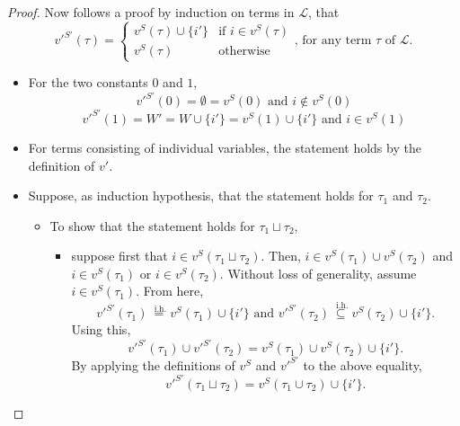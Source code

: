 \documentclass{article}
\newcommand{\lang}{\mathcal{L}}
\newcommand{\lcup}{\sqcup}
\newcommand{\eqih}{\stackrel{\text{ i.h.}}{=}}
\begin{document}
\begin{proof}
Now follows a proof by induction on terms in $\lang$, that
\begin{equation*}
  v'^{S'}(\tau) =
  \begin{cases}
    v^S(\tau) \cup \{i'\} & \text{if } i \in v^S(\tau) \\
    v^S(\tau)             & \text{otherwise}
  \end{cases}
  \text{, for any term } \tau \text{ of } \lang.
\end{equation*}
\begin{itemize}
  \item For the two constants $0$ and $1$,
    \begin{equation*}
      v'^{S'}(0) = \emptyset = v^S(0) \text{ and } i \not \in v^S(0)
    \end{equation*}
    \begin{equation*}
      v'^{S'}(1) = W' = W \cup \{i'\} = v^S(1) \cup \{i'\} \text{ and } i \in v^S(1)
    \end{equation*}
  \item For terms consisting of individual variables, the statement holds by the definition of $v'$.
  \item Suppose, as induction hypothesis, that the statement holds for $\tau_1$ and $\tau_2$.
    \begin{itemize}
    \item To show that the statement holds for $\tau_1 \lcup \tau_2$,
      \begin{itemize}
      \item suppose first that $i \in v^S(\tau_1 \lcup \tau_2)$. Then, $i \in v^S(\tau_1) \cup v^S(\tau_2)$ and $i \in v^S(\tau_1)$ or $i \in v^S(\tau_2)$. Without loss of generality, assume $i \in v^S(\tau_1)$. From here,
        \begin{equation*}
          v'^{S'}(\tau_1) \eqih v^S(\tau_1) \cup \{i'\} \text{ and } v'^{S'}(\tau_2) \stackrel{\text{ i.h.}}{\subseteq} v^S(\tau_2) \cup \{i'\}.
        \end{equation*}
        Using this,
        \begin{equation*}
          v'^{S'}(\tau_1) \cup v'^{S'}(\tau_2) = v^S(\tau_1) \cup v^S(\tau_2) \cup \{i'\}.
        \end{equation*}
        By applying the definitions of $v^S$ and $v'^{S'}$ to the above equality,
        \begin{equation*}
          v'^{S'}(\tau_1 \lcup \tau_2) = v^S(\tau_1 \cup \tau_2) \cup \{i'\}.
        \end{equation*}



\end{itemize}
\end{itemize}
\end{itemize}
\end{proof}
\end{document}
